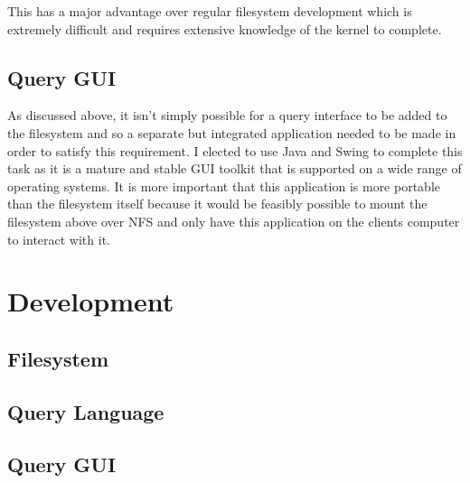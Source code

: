 This has a major advantage over regular filesystem development which is
extremely difficult and requires extensive knowledge of the kernel to complete.

\subsection{Query GUI}

As discussed above, it isn't simply possible for a query interface to be added
to the filesystem and so a separate but integrated application needed to be
made in order to satisfy this requirement. I elected to use Java and Swing to
complete this task as it is a mature and stable \ac{GUI} toolkit that is
supported on a wide range of operating systems. It is more important that this
application is more portable than the filesystem itself because it would be
feasibly possible to mount the filesystem above over \ac{NFS} and only have
this application on the clients computer to interact with it.

\section{Development}

\subsection{Filesystem}

\subsection{Query Language}

\subsection{Query GUI}

